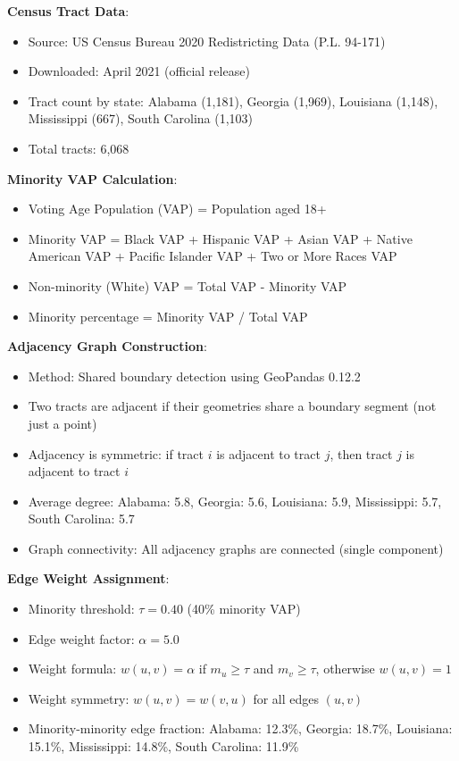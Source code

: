 \textbf{Census Tract Data}:
\begin{itemize}
    \item Source: US Census Bureau 2020 Redistricting Data (P.L. 94-171)
    \item Downloaded: April 2021 (official release)
    \item Tract count by state: Alabama (1,181), Georgia (1,969), Louisiana (1,148), Mississippi (667), South Carolina (1,103)
    \item Total tracts: 6,068
\end{itemize}

\textbf{Minority VAP Calculation}:
\begin{itemize}
    \item Voting Age Population (VAP) = Population aged 18+
    \item Minority VAP = Black VAP + Hispanic VAP + Asian VAP + Native American VAP + Pacific Islander VAP + Two or More Races VAP
    \item Non-minority (White) VAP = Total VAP - Minority VAP
    \item Minority percentage = Minority VAP / Total VAP
\end{itemize}

\textbf{Adjacency Graph Construction}:
\begin{itemize}
    \item Method: Shared boundary detection using GeoPandas 0.12.2
    \item Two tracts are adjacent if their geometries share a boundary segment (not just a point)
    \item Adjacency is symmetric: if tract $i$ is adjacent to tract $j$, then tract $j$ is adjacent to tract $i$
    \item Average degree: Alabama: 5.8, Georgia: 5.6, Louisiana: 5.9, Mississippi: 5.7, South Carolina: 5.7
    \item Graph connectivity: All adjacency graphs are connected (single component)
\end{itemize}

\textbf{Edge Weight Assignment}:
\begin{itemize}
    \item Minority threshold: $\tau = 0.40$ (40\% minority VAP)
    \item Edge weight factor: $\alpha = 5.0$
    \item Weight formula: $w(u,v) = \alpha$ if $m_u \geq \tau$ and $m_v \geq \tau$, otherwise $w(u,v) = 1$
    \item Weight symmetry: $w(u,v) = w(v,u)$ for all edges $(u,v)$
    \item Minority-minority edge fraction: Alabama: 12.3\%, Georgia: 18.7\%, Louisiana: 15.1\%, Mississippi: 14.8\%, South Carolina: 11.9\%
\end{itemize}

